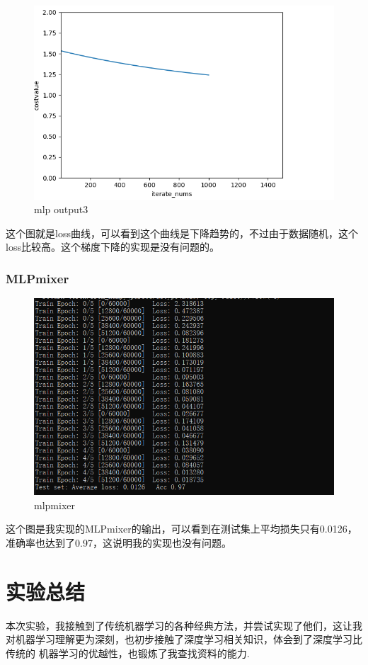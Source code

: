 \documentclass{report}
\begin{document}
    \begin{figure}[H]
        \centering
        \includegraphics[width=15cm]{MLPloss.png}
        \caption{mlp output3}
    \end{figure}
    这个图就是loss曲线，可以看到这个曲线是下降趋势的，不过由于数据随机，这个loss比较高。这个梯度下降的实现是没有问题的。\par
    \subsection{MLPmixer}
    \begin{figure}[H]
        \centering
        \includegraphics[width=15cm]{mlpmixer.png}
        \caption{mlpmixer}
    \end{figure}
    这个图是我实现的MLPmixer的输出，可以看到在测试集上平均损失只有0.0126，准确率也达到了0.97，这说明我的实现也没有问题。\par 



    \chapter{实验总结}
    本次实验，我接触到了传统机器学习的各种经典方法，并尝试实现了他们，这让我对机器学习理解更为深刻，也初步接触了深度学习相关知识，体会到了深度学习比传统的
    机器学习的优越性，也锻炼了我查找资料的能力.






    
\end{document}

